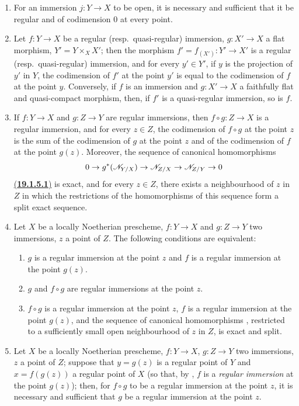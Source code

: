 \begin{proposition}[19.1.5]
\label{IV.19.1.5}
\medskip\noindent
\begin{enumerate}[label=\textup{(\roman*)}]
  \item For an immersion $j:Y\to X$ to be open, it is necessary and sufficient that it be regular and of codimension $0$ at every point.
  \item Let $f:Y\to X$ be a regular \textup{(resp.}\ quasi-regular\textup{)} immersion, $g:X'\to X$ a flat morphism, $Y'=Y\times_X X'$; then the morphism $f'=f_{(X')}:Y'\to X'$ is a regular \textup{(resp.}\ quasi-regular\textup{)} immersion, and for every $y'\in Y'$, if $y$ is the projection of $y'$ in $Y$, the codimension of $f'$ at the point $y'$ is equal to the codimension of $f$ at the point $y$.
Conversely, if $f$ is an immersion and $g:X'\to X$ a faithfully flat and quasi-compact morphism, then, if $f'$ is a quasi-regular immersion, so is $f$.
  \item If $f:Y\to X$ and $g:Z\to Y$ are regular immersions, then $f\circ g:Z\to X$ is a regular immersion, and for every $z\in Z$, the codimension of $f\circ g$ at the point $z$ is the sum of the codimension of $g$ at the point $z$ and of the codimension of $f$ at the point $g(z)$.
Moreover, the sequence of canonical homomorphisms 
\[
  0\to g^*(\mathscr{N}_{Y/X})\to\mathscr{N}_{Z/X}\to\mathscr{N}_{Z/Y}\to 0
\]
{\hyperref[IV.19.1.5.1]{(\textbf{19.1.5.1})}}
\label{IV.19.1.5.1}
is exact, and for every $z\in Z$, there exists a neighbourhood of $z$ in $Z$ in which the restrictions of the homomorphisms of this sequence form a split exact sequence.
  \item Let $X$ be a locally Noetherian prescheme, $f:Y\to X$ and $g:Z\to Y$ two immersions, $z$ a point of $Z$.
The following conditions are equivalent:
  \begin{enumerate}[label=\emph{\alph*)}]
    \item $g$ is a regular immersion at the point $z$ and $f$ is a regular immersion at the point $g(z)$.
    \item $g$ and $f\circ g$ are regular immersions at the point $z$.
    \item $f\circ g$ is a regular immersion at the point $z$, $f$ is a regular immersion at the point $g(z)$, and the sequence of canonical homomorphisms , restricted to a sufficiently small open neighbourhood of $z$ in $Z$, is exact and split.
  \end{enumerate}
  \item Let $X$ be a locally Noetherian prescheme, $f:Y\to X$, $g:Z\to Y$ two immersions, $z$ a point of $Z$; suppose that $y=g(z)$ is a regular point of $Y$ and $x=f(g(z))$ a regular point
of $X$ \textup{(so that, by , $f$ is a \emph{regular immersion} at the point $g(z)$)}; then,
for $f\circ g$ to be a regular immersion at the point $z$, it is necessary and sufficient that $g$ be a regular immersion at the point $z$.
\end{enumerate}
\end{proposition}


